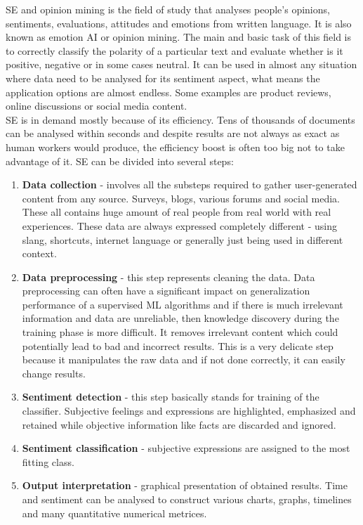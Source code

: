 SE and opinion mining is the field of study that analyses people's opinions, sentiments, evaluations, attitudes and emotions from written language.\cite{liu2012sentiment} It is also known as emotion AI or opinion mining. The main and basic task of this field is to correctly classify the polarity of a particular text and evaluate whether is it positive, negative or in some cases neutral. It can be used in almost any situation where data need to be analysed for its sentiment aspect, what means the application options are almost endless.  Some examples are product reviews, online discussions or social media content.\\
SE is in demand mostly because of its efficiency. Tens of thousands of documents can be analysed within seconds and despite results are not always as exact as human workers would produce, the efficiency boost is often too big not to take advantage of it. SE can be divided into several steps:
\begin{enumerate}
  \item \textbf{Data collection} - involves all the substeps required to gather user-generated content from any source. Surveys, blogs, various forums and social media. These all contains huge amount of real people from real world with real experiences. These data are always expressed completely different - using slang, shortcuts, internet language or generally just being used in different context.
  \item \textbf{Data preprocessing} - this step represents cleaning the data. Data preprocessing can often have a significant impact on generalization performance of a supervised ML algorithms \cite{kotsiantis2006data} and if there is much irrelevant information and data are unreliable, then knowledge discovery during the training phase is more difficult. It removes irrelevant content which could potentially lead to bad and incorrect results. This is a very delicate step because it manipulates the raw data and if not done correctly, it can easily change results.
  \item \textbf{Sentiment detection} - this step basically stands for training of the classifier. Subjective feelings and expressions are highlighted, emphasized and retained while objective information like facts are discarded and ignored. 
  \item \textbf{Sentiment classification} - subjective expressions are assigned to the most fitting class.
    \item \textbf{Output interpretation} - graphical presentation of obtained results. Time and sentiment can be analysed to construct various charts, graphs, timelines and many quantitative numerical metrices.
\end{enumerate}

